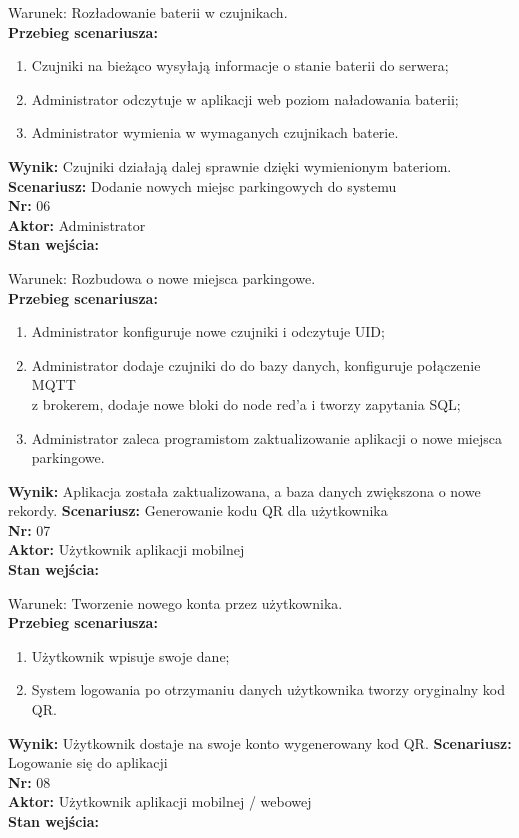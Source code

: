 \documentclass[12pt,a4paper]{article}
\begin{document}
Warunek: Rozładowanie baterii w czujnikach.
\\{\bf Przebieg scenariusza:}
\begin{enumerate}
\item Czujniki na bieżąco wysyłają informacje o stanie baterii do serwera;
\item Administrator odczytuje w aplikacji web poziom naładowania baterii;
\item Administrator wymienia w wymaganych czujnikach baterie.
\end{enumerate}
{\bf Wynik:} Czujniki działają dalej sprawnie dzięki wymienionym bateriom.
\newline\newline
{\large \bf Scenariusz:} Dodanie nowych miejsc parkingowych do systemu
\\{\bf Nr:} 06
\\{\bf Aktor:} Administrator
\\{\bf Stan wejścia:}

Warunek: Rozbudowa o nowe miejsca parkingowe.
\\{\bf Przebieg scenariusza:}
\begin{enumerate}
\item Administrator konfiguruje nowe czujniki i odczytuje UID;
\item Administrator dodaje czujniki do do bazy danych, konfiguruje połączenie MQTT\\z brokerem, dodaje nowe bloki do node red’a i tworzy zapytania SQL;
\item Administrator zaleca programistom zaktualizowanie aplikacji o nowe miejsca\\parkingowe.
\end{enumerate}
{\bf Wynik:} Aplikacja została zaktualizowana, a baza danych zwiększona o nowe rekordy.
\newline\newline
{\large \bf Scenariusz:} Generowanie kodu QR dla użytkownika
\\{\bf Nr:} 07
\\{\bf Aktor:} Użytkownik aplikacji mobilnej
\\{\bf Stan wejścia:}

Warunek: Tworzenie nowego konta przez użytkownika.
\\{\bf Przebieg scenariusza:}
\begin{enumerate}
\item Użytkownik wpisuje swoje dane;
\item System logowania po otrzymaniu danych użytkownika tworzy oryginalny kod QR.
\end{enumerate}
{\bf Wynik:} Użytkownik dostaje na swoje konto wygenerowany kod QR.
\newline\newline\newline\newline\newline\newline
{\large \bf Scenariusz:} Logowanie się do aplikacji
\\{\bf Nr:} 08
\\{\bf Aktor:} Użytkownik aplikacji mobilnej / webowej
\\{\bf Stan wejścia:}
\end{document}
